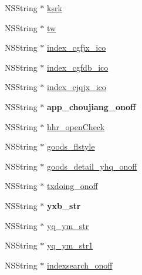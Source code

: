 \begin{DoxyCompactItemize}
\item 
N\+S\+String $\ast$ \mbox{\hyperlink{interface_f_n_base_setting_model_a7579c3d3a8f7482d6d7e73eef060ce88}{ksrk}}
\item 
N\+S\+String $\ast$ \mbox{\hyperlink{interface_f_n_base_setting_model_a42f731a0b203c7d27dda7f3a46e33a36}{tw}}
\item 
N\+S\+String $\ast$ \mbox{\hyperlink{interface_f_n_base_setting_model_a51c3e92448c1fd540b136f059fc96260}{index\+\_\+cgfjx\+\_\+ico}}
\item 
N\+S\+String $\ast$ \mbox{\hyperlink{interface_f_n_base_setting_model_a9c8f178cfa8b7865f30d8cd316844785}{index\+\_\+cgfdb\+\_\+ico}}
\item 
N\+S\+String $\ast$ \mbox{\hyperlink{interface_f_n_base_setting_model_ad1b6b500f8474768d11a0736c012182b}{index\+\_\+cjqjx\+\_\+ico}}
\item 
\mbox{\label{interface_f_n_base_setting_model_a062a887e526d3291ed8f1699ca977b4e}} 
N\+S\+String $\ast$ {\bfseries app\+\_\+choujiang\+\_\+onoff}
\item 
N\+S\+String $\ast$ \mbox{\hyperlink{interface_f_n_base_setting_model_ab95db7f9ee06a7e9db583cf099e86420}{hhr\+\_\+open\+Check}}
\item 
N\+S\+String $\ast$ \mbox{\hyperlink{interface_f_n_base_setting_model_aff1f9a45da63d72cd15747fba23c0050}{goods\+\_\+flstyle}}
\item 
N\+S\+String $\ast$ \mbox{\hyperlink{interface_f_n_base_setting_model_a54c7a6dcd6e39e6aff40930a10850bae}{goods\+\_\+detail\+\_\+yhq\+\_\+onoff}}
\item 
N\+S\+String $\ast$ \mbox{\hyperlink{interface_f_n_base_setting_model_ad79eac095d249be765695f542f7582c2}{txdoing\+\_\+onoff}}
\item 
\mbox{\label{interface_f_n_base_setting_model_ab73ff0775d16399639cf3254c4c3e47d}} 
N\+S\+String $\ast$ {\bfseries yxb\+\_\+str}
\item 
N\+S\+String $\ast$ \mbox{\hyperlink{interface_f_n_base_setting_model_a5de2c19580fdb17653d78f24abaaa1eb}{yq\+\_\+ym\+\_\+str}}
\item 
N\+S\+String $\ast$ \mbox{\hyperlink{interface_f_n_base_setting_model_ab8294190dd52c7d7340b6c7d852b7861}{yq\+\_\+ym\+\_\+str1}}
\item 
N\+S\+String $\ast$ \mbox{\hyperlink{interface_f_n_base_setting_model_ae9722749334e3b1d8ea29c0e558d7bc4}{indexsearch\+\_\+onoff}}
\end{DoxyCompactItemize}


